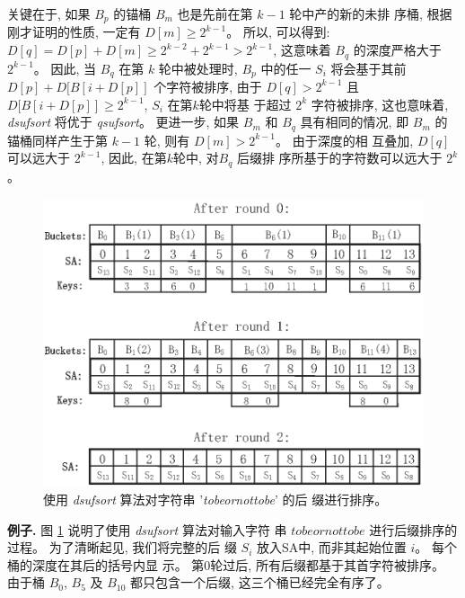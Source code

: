 关键在于, 如果 $B_p$ 的锚桶 $B_m$ 也是先前在第 $k-1$ 轮中产的新的未排
序桶, 根据刚才证明的性质, 一定有 $D[m] \geq 2^{k-1}$。 所以, 可以得到:
$D[q] = D[p] + D[m] \geq 2^{k-2} + 2^{k-1} > 2^{k-1}$, 这意味着 $B_q$
的深度严格大于 $2^{k-1}$。 因此, 当 $B_q$ 在第 $k$ 轮中被处理时, $B_p$
中的任一 $S_i$ 将会基于其前 $D[p] + D[B[i+D[p]]$ 个字符被排序, 由于
$D[q] > 2^{k-1}$ 且 $D[B[i+D[p]] \geq 2^{k-1}$, $S_i$ 在第$k$轮中将基
于超过 $2^k$ 字符被排序, 这也意味着, \emph{dsufsort} 将优于
\emph{qsufsort}。 更进一步, 如果 $B_m$ 和 $B_q$ 具有相同的情况, 即
$B_m$ 的锚桶同样产生于第 $k-1$ 轮, 则有 $D[m] > 2^{k-1}$。 由于深度的相
互叠加, $D[q]$ 可以远大于 $2^{k-1}$, 因此, 在第$k$轮中, 对$B_q$ 后缀排
序所基于的字符数可以远大于 $2^k$。

\begin{figure}[H]
\centering
\includegraphics[height=8.5cm ,width=12.5cm]{figures/3_SS/p1}
\vspace*{8pt}
\caption{使用 \emph{dsufsort} 算法对字符串 '\emph{tobeornottobe}' 的后
  缀进行排序。}
\label{fig:1}
\end{figure}

\textbf{例子.} 图 \ref{fig:1} 说明了使用 \emph{dsufsort} 算法对输入字符
串 $tobeornottobe$ 进行后缀排序的过程。 为了清晰起见, 我们将完整的后
缀 $S_i$ 放入SA中, 而非其起始位置 $i$。 每个桶的深度在其后的括号内显
示。 第0轮过后, 所有后缀都基于其首字符被排序。 由于桶 $B_0$,
$B_5$ 及 $B_{10}$ 都只包含一个后缀, 这三个桶已经完全有序了。


